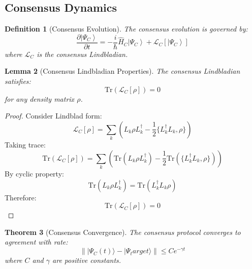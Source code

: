 \documentclass[12pt]{article}
\newcommand{\ket}[1]{\left|#1\right\rangle}
\newcommand{\tr}{\text{Tr}}
\newcommand{\op}[1]{\hat{#1}}
\newtheorem{theorem}{Theorem}[section]
\newtheorem{lemma}[theorem]{Lemma}
\newtheorem{definition}[theorem]{Definition}
\begin{document}
\subsection{Consensus Dynamics}
\begin{definition}[Consensus Evolution]
The consensus evolution is governed by:
\begin{equation}
\frac{\partial\ket{\Psi_C}}{\partial t} = -\frac{i}{\hbar}\op{H}_C\ket{\Psi_C} + \mathcal{L}_C[\ket{\Psi_C}]
\end{equation}
where $\mathcal{L}_C$ is the consensus Lindbladian.
\end{definition}
\begin{lemma}[Consensus Lindbladian Properties]
The consensus Lindbladian satisfies:
\begin{equation}
\tr(\mathcal{L}_C[\rho]) = 0
\end{equation}
for any density matrix $\rho$.
\end{lemma}
\begin{proof}
Consider Lindblad form:
\begin{equation}
\mathcal{L}_C[\rho] = \sum_k(L_k\rho L_k^\dagger - \frac{1}{2}\{L_k^\dagger L_k,\rho\})
\end{equation}
Taking trace:
\begin{equation}
\tr(\mathcal{L}_C[\rho]) = \sum_k(\tr(L_k\rho L_k^\dagger) - \frac{1}{2}\tr(\{L_k^\dagger L_k,\rho\}))
\end{equation}
By cyclic property:
\begin{equation}
\tr(L_k\rho L_k^\dagger) = \tr(L_k^\dagger L_k\rho)
\end{equation}
Therefore:
\begin{equation}
\tr(\mathcal{L}_C[\rho]) = 0
\end{equation}
\end{proof}
\begin{theorem}[Consensus Convergence]
The consensus protocol converges to agreement with rate:
\begin{equation}
\||\Psi_C(t)\rangle - |\Psi_target\rangle\| \leq Ce^{-\gamma t}
\end{equation}
where $C$ and $\gamma$ are positive constants.
\end{theorem}
\end{document}
